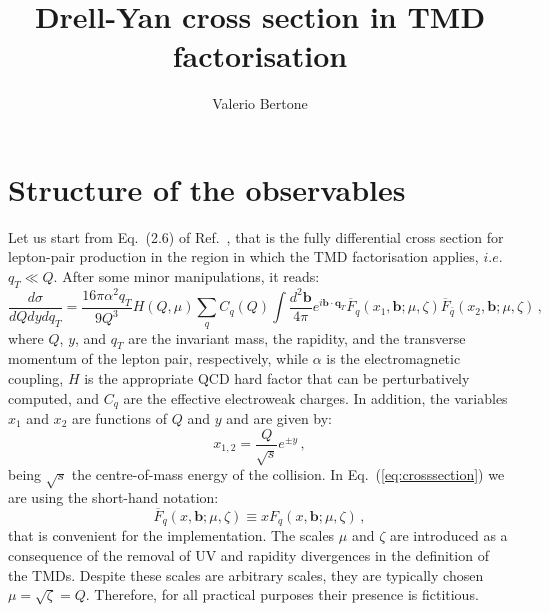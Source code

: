 \documentclass[10pt,a4paper]{article}
\begin{document}
\title{Drell-Yan cross section in TMD factorisation}

\author{Valerio Bertone}

\maketitle

\tableofcontents{}

\section{Structure of the observables}

Let us start from Eq.~(2.6) of Ref.~\cite{Scimemi:2017etj}, that is
the fully differential cross section for lepton-pair production in the
region in which the TMD factorisation applies, $i.e.$ $q_T \ll
Q$. After some minor manipulations, it reads:
\begin{equation}\label{eq:crosssection}
  \frac{d\sigma}{dQ dy dq_T} =
  \frac{16\pi\alpha^2q_T}{9 Q^3} H(Q,\mu) \sum_q C_q(Q)
  \int\frac{d^2\mathbf{b}}{4\pi} e^{i \mathbf{b}\cdot \mathbf{q}_T} \overline{F}_q(x_1,\mathbf{b};\mu,\zeta) \overline{F}_{\bar{q}}(x_2,\mathbf{b};\mu,\zeta)\,,
\end{equation}
where $Q$, $y$, and $q_T$ are the invariant mass, the rapidity, and
the transverse momentum of the lepton pair, respectively, while
$\alpha$ is the electromagnetic coupling, $H$ is the appropriate QCD
hard factor that can be perturbatively computed, and $C_q$ are the
effective electroweak charges. In addition, the variables $x_1$ and
$x_2$ are functions of $Q$ and $y$ and are given by:
\begin{equation}\label{eq:Bjorkenx12}
  x_{1,2} = \frac{Q}{\sqrt{s}}e^{\pm y}\,,
\end{equation}
being $\sqrt{s}$ the centre-of-mass energy of the collision. In
Eq.~(\ref{eq:crosssection}) we are using the short-hand notation:
\begin{equation}
\overline{F}_q(x,\mathbf{b};\mu,\zeta) \equiv xF_q(x,\mathbf{b};\mu,\zeta)\,,
\end{equation}
that is convenient for the implementation. The scales $\mu$ and
$\zeta$ are introduced as a consequence of the removal of UV and
rapidity divergences in the definition of the TMDs. Despite these
scales are arbitrary scales, they are typically chosen
$\mu=\sqrt{\zeta}=Q$. Therefore, for all practical purposes their
presence is fictitious.
\end{document}
